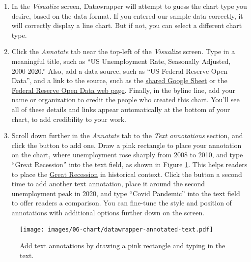 \documentclass[
  english,
]{book}
\begin{document}
\begin{enumerate}
\def\labelenumi{\arabic{enumi}.}
\setcounter{enumi}{4}
\item
  In the \emph{Visualize} screen, Datawrapper will attempt to guess the chart type you desire, based on the data format. If you entered our sample data correctly, it will correctly display a line chart. But if not, you can select a different chart type.
\item
  Click the \emph{Annotate} tab near the top-left of the \emph{Visualize} screen. Type in a meaningful title, such as ``US Unemployment Rate, Seasonally Adjusted, 2000-2020.'' Also, add a data source, such as ``US Federal Reserve Open Data'', and a link to the source, such as the \href{https://docs.google.com/spreadsheets/d/1mjUu4OfMjWfFP-miPiObi6vXzJUIMi1TSuoaT61FU6U/edit\#gid=821851972}{shared Google Sheet} or the \href{https://fred.stlouisfed.org/series/UNRATE}{Federal Reserve Open Data web page}. Finally, in the byline line, add your name or organization to credit the people who created this chart. You'll see all of these details and links appear automatically at the bottom of your chart, to add credibility to your work.
\item
  Scroll down further in the \emph{Annotate} tab to the \emph{Text annotations} section, and click the button to add one. Draw a pink rectangle to place your annotation on the chart, where unemployment rose sharply from 2008 to 2010, and type ``Great Recession'' into the text field, as shown in Figure \ref{fig:datawrapper-annotated-text}. This helps readers to place the \href{https://en.wikipedia.org/wiki/Great_Recession_in_the_United_States}{Great Recession} in historical context. Click the button a second time to add another text annotation, place it around the second unemployment peak in 2020, and type ``Covid Pandemic'' into the text field to offer readers a comparison. You can fine-tune the style and position of annotations with additional options further down on the screen.
\end{enumerate}



\begin{figure}
\centering
\texttt{[image: images/06-chart/datawrapper-annotated-text.pdf]}
\caption{\label{fig:datawrapper-annotated-text}Add text annotations by drawing a pink rectangle and typing in the text.}
\end{figure}
\end{document}
